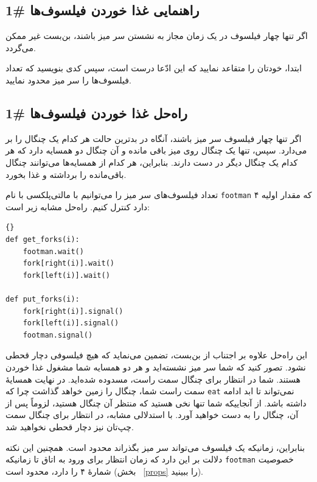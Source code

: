 \documentclass{book}
\newcommand{\clearemptydoublepage}{}%
\begin{document}
\clearemptydoublepage
\subsection{راهنمایی غذا خوردن فیلسوف‌ها \#1}

    اگر تنها چهار فیلسوف در یک زمان مجاز به نشستن سر میز باشند، بن‌بست غیر ممکن می‌گردد. 

    ابتدا، خودتان را متقاعد نمایید که این ادّعا درست است، سپس کدی بنویسید که تعداد فیلسوف‌ها را سر میز محدود نمایید. 


\clearemptydoublepage
\subsection{راه‌حل غذا خوردن فیلسوف‌ها  \#1}

    اگر تنها چهار فیلسوف سر میز باشند، آنگاه در بدترین حالت هر کدام یک چنگال را بر می‌دارد. سپس، تنها یک چنگال روی میز باقی‌ مانده و 
    آن چنگال دو همسایه دارد که هر کدام یک چنگال دیگر در دست دارند. بنابراین، هر کدام از همسایه‌ها می‌توانند چنگال باقی‌مانده را برداشته و غذا بخورد. 

    تعداد فیلسوف‌های سر میز را می‌توانیم با مالتی‌پلکسی با نام {\tt footman} که مقدار اولیه ۴ دارد کنترل کنیم. 
    راه‌حل مشابه زیر است: 

\begin{latin}
\begin{lstlisting}[title=\rl{راه‌حل غذا خوردن فیلسوف‌ها \#1}]{}
def get_forks(i):
    footman.wait()
    fork[right(i)].wait()
    fork[left(i)].wait()

def put_forks(i):
    fork[right(i)].signal()
    fork[left(i)].signal()
    footman.signal()
\end{lstlisting}
\end{latin}

    این راه‌حل علاوه بر اجتناب از بن‌بست،  تضمین می‌نماید که هیچ فیلسوفی دچار قحطی نشود. 
    تصور کنید که شما سر میز نشسته‌اید و هر دو همسایه شما مشغول غذا خوردن هستند. 
    شما در انتظار برای چنگال سمت راست، مسدوده شده‌اید. در نهایت همسایهٔ سمت راست شما، 
    چنگال را زمین خواهد گذاشت چرا که  {\tt eat} 
    نمی‌تواند تا ابد ادامه داشته باشد. از آنجاییکه شما تنها نخی هستید که منتظر آن چنگال هستید، لزوماً پس از آن، 
    چنگال را به دست خواهید آورد. 
    با استدلالی مشابه، در انتظار برای چنگال سمت چپ‌تان نیز دچار قحطی نخواهید شد. 
    
    بنابراین، زمانیکه یک فیلسوف می‌تواند سر میز بگذراند محدود است. همچنین این نکته دلالت بر این دارد که زمان انتظار برای ورود به اتاق 
    تا زمانیکه {\tt footman}  خصوصیت شمارهٔ ۴ را دارد، محدود است (بخش ~\ref{props} را ببینید). 
     
\end{document}
